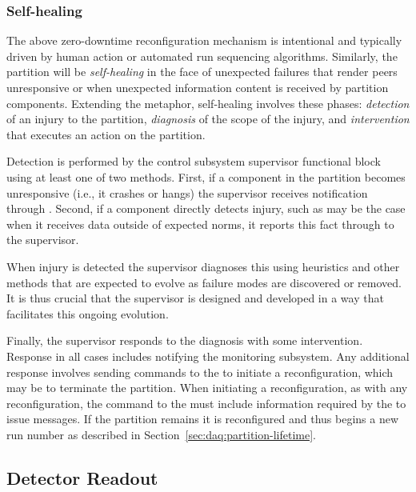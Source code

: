 \subsubsection{Self-healing}
\label{sec:daq:self-healing}

The above zero-downtime reconfiguration mechanism is intentional and typically driven by human action or automated run sequencing algorithms. 
Similarly, the partition will be \textit{self-healing} in the face of unexpected failures that render peers unresponsive or when unexpected information content is received by partition components.  
Extending the metaphor, self-healing involves these phases: \textit{detection} of an injury to the partition, \textit{diagnosis} of the scope of the injury, and \textit{intervention} that executes an action on the partition.

Detection is performed by the  control subsystem supervisor functional block using at least one of two methods.
First, if a component in the partition becomes unresponsive (i.e., it crashes or hangs) the supervisor  receives notification through  . 
Second, if a component directly detects injury, such as may be the case when it receives  data outside of expected norms, it reports this fact through  to the supervisor.

When injury is detected the supervisor  diagnoses this using heuristics and other methods that are expected to evolve as failure modes are discovered or removed. 
It is thus crucial that the supervisor is designed and developed in a way that facilitates this ongoing evolution.  

Finally, the supervisor responds to the diagnosis with some intervention. 
Response  in all cases includes notifying the monitoring subsystem. 
Any additional response involves sending commands to the  to initiate a reconfiguration,  which may be to terminate the partition.
When initiating a reconfiguration, as with any reconfiguration, the command to the  must include information required by the  to issue  messages. 
If the partition remains it is reconfigured and thus begins a new run number as described in Section~\ref{sec:daq:partition-lifetime}.


\subsection{Detector Readout}
\label{sec:daq:design-readout}

